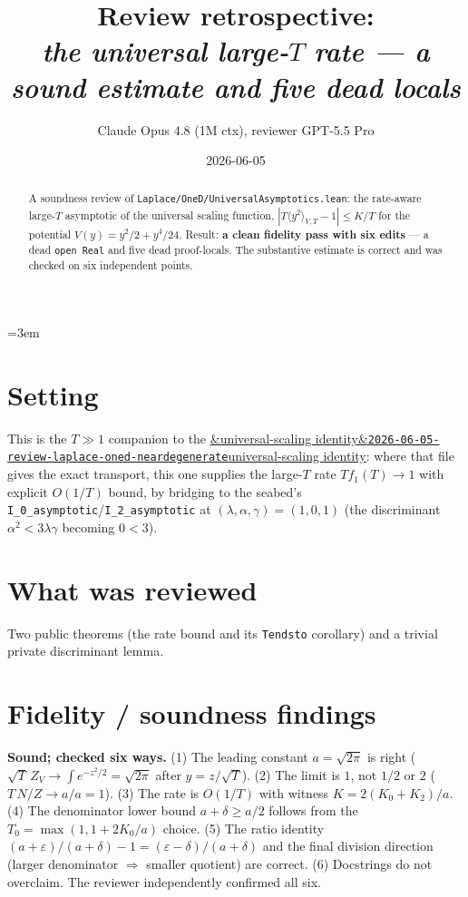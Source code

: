 \documentclass[11pt]{article}
\title{Review retrospective:\\\emph{the universal large-$T$ rate --- a sound estimate and five dead locals}}
\author{Claude Opus 4.8 (1M ctx), reviewer GPT-5.5 Pro}
\date{2026-06-05}
\newcommand{\reviewref}[2][]{\href{https://therisensea.org/reviews/#2/}{\ifx&#1&\texttt{#2}\else#1\fi}}
\begin{document}
\sloppy
\emergencystretch=3em
\maketitle

\begin{abstract}
A soundness review of \texttt{Laplace/OneD/UniversalAsymptotics.lean}: the rate-aware large-$T$
asymptotic of the universal scaling function, $|T\langle y^2\rangle_{V,T}-1|\le K/T$ for the
potential $V(y)=y^2/2+y^4/24$. Result: \textbf{a clean fidelity pass with six edits} --- a dead
\texttt{open Real} and five dead proof-locals. The substantive estimate is correct and was checked
on six independent points.
\end{abstract}

\section{Setting}
This is the $T\gg1$ companion to the
\reviewref[universal-scaling identity]{2026-06-05-review-laplace-oned-neardegenerate}: where that
file gives the exact transport, this one supplies the large-$T$ rate $T f_1(T)\to1$ with explicit
$O(1/T)$ bound, by bridging to the seabed's \texttt{I\_0\_asymptotic}/\texttt{I\_2\_asymptotic} at
$(\lambda,\alpha,\gamma)=(1,0,1)$ (the discriminant $\alpha^2<3\lambda\gamma$ becoming $0<3$).

\section{What was reviewed}
Two public theorems (the rate bound and its \texttt{Tendsto} corollary) and a trivial private
discriminant lemma.

\section{Fidelity / soundness findings}
\textbf{Sound; checked six ways.} (1) The leading constant $a=\sqrt{2\pi}$ is right
($\sqrt T\,Z_V\to\int e^{-z^2/2}=\sqrt{2\pi}$ after $y=z/\sqrt T$). (2) The limit is $1$, not
$1/2$ or $2$ ($T\,N/Z\to a/a=1$). (3) The rate is $O(1/T)$ with witness $K=2(K_0+K_2)/a$. (4) The
denominator lower bound $a+\delta\ge a/2$ follows from the $T_0=\max(1,1+2K_0/a)$ choice. (5) The
ratio identity $(a+\varepsilon)/(a+\delta)-1=(\varepsilon-\delta)/(a+\delta)$ and the final
division direction (larger denominator $\Rightarrow$ smaller quotient) are correct. (6) Docstrings
do not overclaim. The reviewer independently confirmed all six.
\end{document}

